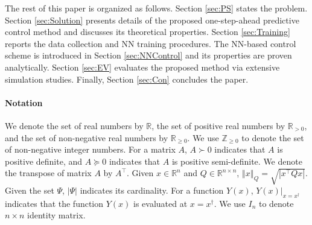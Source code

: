 \documentclass[1p,times]{elsarticle}
\begin{document}



The rest of this paper is organized as follows. Section \ref{sec:PS} states the problem. Section \ref{sec:Solution} presents details of the proposed one-step-ahead predictive control method and discusses its theoretical properties. Section \ref{sec:Training} reports the data collection and NN training procedures. The NN-based control scheme is introduced in Section \ref{sec:NNControl} and its properties are proven analytically. Section \ref{sec:EV} evaluates the proposed method via extensive simulation studies. Finally, Section \ref{sec:Con} concludes the paper.



\paragraph*{Notation} We denote the set of real numbers by $\mathbb{R}$, the set of positive real numbers by $\mathbb{R}_{>0}$, and the set of non-negative real numbers by $\mathbb{R}_{\geq0}$. We use $\mathbb{Z}_{\geq0}$ to denote the set of non-negative integer numbers. For a matrix $A$, $A\succ0$ indicates that $A$ is positive definite, and $A\succeq0$ indicates that $A$ is positive semi-definite. We denote the transpose of matrix $A$ by $A^\top$. Given $x\in\mathbb{R}^n$ and $Q\in\mathbb{R}^{n\times n}$, $\left\Vert x\right\Vert_Q=\sqrt{\left\vert x^\top Qx\right\vert}$. Given the set $\Psi$, $|\Psi|$ indicates its cardinality. For a function $Y(x)$, $Y(x)|_{x=x^\dag}$ indicates that the function $Y(x)$ is evaluated at $x=x^\dag$. We use $I_n$ to denote $n\times n$ identity matrix.



\end{document}
